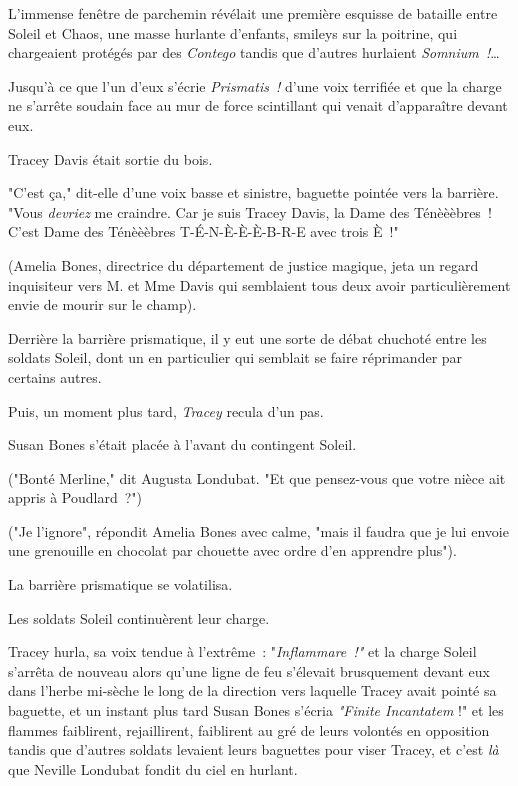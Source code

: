 \later

L'immense fenêtre de parchemin révélait une première esquisse de bataille entre Soleil et Chaos, une masse hurlante d'enfants, smileys sur la poitrine, qui chargeaient protégés par des \emph{Contego} tandis que d'autres hurlaient \emph{Somnium~!}…

Jusqu'à ce que l'un d'eux s'écrie \emph{Prismatis~!} d'une voix terrifiée et que la charge ne s'arrête soudain face au mur de force scintillant qui venait d'apparaître devant eux.

Tracey Davis était sortie du bois.

"C'est ça," dit-elle d'une voix basse et sinistre, baguette pointée vers la barrière. "Vous \emph{devriez} me craindre. Car je suis Tracey Davis, la Dame des Ténèèèbres~! C'est Dame des Ténèèèbres T-É-N-È-È-È-B-R-E avec trois È~!"

(Amelia Bones, directrice du département de justice magique, jeta un regard inquisiteur vers M. et Mme Davis qui semblaient tous deux avoir particulièrement envie de mourir sur le champ).

Derrière la barrière prismatique, il y eut une sorte de débat chuchoté entre les soldats Soleil, dont un en particulier qui semblait se faire réprimander par certains autres.

Puis, un moment plus tard, \emph{Tracey} recula d'un pas.

Susan Bones s'était placée à l'avant du contingent Soleil.

("Bonté Merline," dit Augusta Londubat. "Et que pensez-vous que votre nièce ait appris à Poudlard~?")

("Je l'ignore", répondit Amelia Bones avec calme, "mais il faudra que je lui envoie une grenouille en chocolat par chouette avec ordre d'en apprendre plus").

La barrière prismatique se volatilisa.

Les soldats Soleil continuèrent leur charge.

Tracey hurla, sa voix tendue à l'extrême~: "\emph{Inflammare~!"} et la charge Soleil s'arrêta de nouveau alors qu'une ligne de feu s'élevait brusquement devant eux dans l'herbe mi-sèche le long de la direction vers laquelle Tracey avait pointé sa baguette, et un instant plus tard Susan Bones s'écria \emph{"Finite Incantatem} !" et les flammes faiblirent, rejaillirent, faiblirent au gré de leurs volontés en opposition tandis que d'autres soldats levaient leurs baguettes pour viser Tracey, et c'est \emph{là} que Neville Londubat fondit du ciel en hurlant.

